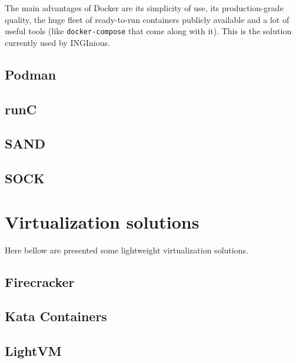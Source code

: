 The main advantages of Docker are its simplicity of use, its production-grade quality, the huge fleet of ready-to-run containers publicly available and a lot of useful tools (like \texttt{docker-compose} that come along with it).  This is the solution currently used by INGInious.

\subsection{Podman}
\subsection{runC}
\subsection{SAND}
\subsection{SOCK} \cite{oakes2018sock}

\section{Virtualization solutions}

Here bellow are presented some lightweight virtualization solutions.

\subsection{Firecracker}
\subsection{Kata Containers}
\subsection{LightVM} \cite{manco2017my}
